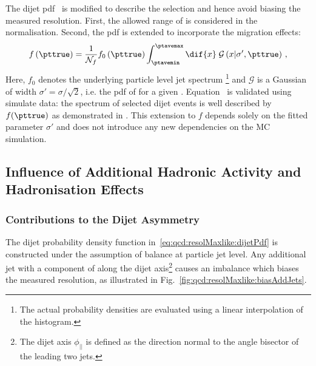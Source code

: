 The dijet pdf~ is modified to describe the
\ptave selection and hence avoid biasing the measured resolution.
First, the allowed range of \ptave is considered in the normalisation. 
Second, the \pttrue pdf is extended to incorporate the migration effects:
\begin{equation}
  \label{eq:ResFit:Asym:ModifiedSpectrum}
  f\left(\pttrue\right) = \frac{1}{\mathcal{N}_{f}}
  f_{0}\left(\pttrue\right) \int^{\ptavemax}_{\ptavemin}\dif{x}\;\mathcal{G}\left(x|\sigma',\pttrue\right) \, ,
\end{equation}
Here, $f_{0}$ denotes the underlying particle level jet \pt spectrum \footnote{The actual probability densities are evaluated using a linear interpolation of the histogram.} and $\mathcal{G}$ is a Gaussian of width \mbox{$\sigma' = \sigma/\sqrt{2}$}, i.e. the pdf of \ptave for a given \pttrue.
Equation~ is validated using simulate data:
the \ptgen spectrum of selected dijet events is well described by $f(\pttrue)$ as demonstrated in .
This extension to $f$ depends solely on the fitted parameter $\sigma'$ and does not introduce any new dependencies on the MC simulation.





\subsection{Influence of Additional Hadronic Activity and Hadronisation Effects}\label{sec:ResFit:AddJets}


\subsubsection{Contributions to the Dijet Asymmetry}\label{sec:ResFit:AddJets:Contributions}

The dijet probability density function
in~\eqref{eq:qcd:resolMaxlike:dijetPdf} is constructed under the
assumption of \pt balance at particle jet level.
Any additional jet with a component of \pt along the dijet
axis\footnote{The dijet axis $\phi_{||}$ is defined as the direction normal to the
angle bisector of the leading two jets.} causes an
imbalance which biases the measured resolution, as
illustrated in Fig.~\ref{fig:qcd:resolMaxlike:biasAddJets}.

